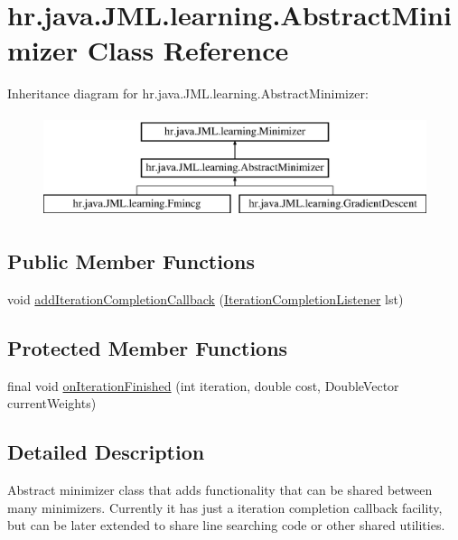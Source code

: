 \hypertarget{classhr_1_1java_1_1_j_m_l_1_1learning_1_1_abstract_minimizer}{\section{hr.\+java.\+J\+M\+L.\+learning.\+Abstract\+Minimizer Class Reference}
\label{classhr_1_1java_1_1_j_m_l_1_1learning_1_1_abstract_minimizer}
}
Inheritance diagram for hr.\+java.\+J\+M\+L.\+learning.\+Abstract\+Minimizer\+:\begin{figure}[H]
\begin{center}
\leavevmode
\includegraphics[height=3.000000cm]{classhr_1_1java_1_1_j_m_l_1_1learning_1_1_abstract_minimizer}
\end{center}
\end{figure}
\subsection*{Public Member Functions}
\begin{DoxyCompactItemize}
\item 
void \hyperlink{classhr_1_1java_1_1_j_m_l_1_1learning_1_1_abstract_minimizer_adbd6e7474e0ca526fb06f3abdcd2dff9}{add\+Iteration\+Completion\+Callback} (\hyperlink{interfacehr_1_1java_1_1_j_m_l_1_1learning_1_1_iteration_completion_listener}{Iteration\+Completion\+Listener} lst)
\end{DoxyCompactItemize}
\subsection*{Protected Member Functions}
\begin{DoxyCompactItemize}
\item 
final void \hyperlink{classhr_1_1java_1_1_j_m_l_1_1learning_1_1_abstract_minimizer_ad72fedd9f52c8c74b178bfac915b122f}{on\+Iteration\+Finished} (int iteration, double cost, Double\+Vector current\+Weights)
\end{DoxyCompactItemize}


\subsection{Detailed Description}
Abstract minimizer class that adds functionality that can be shared between many minimizers. Currently it has just a iteration completion callback facility, but can be later extended to share line searching code or other shared utilities.

